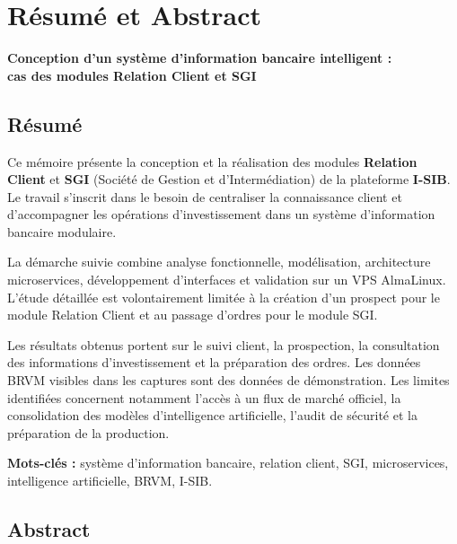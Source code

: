 \clearpage
\chapter*{Résumé et Abstract}
{}

\begin{center}
\textbf{Conception d'un système d'information bancaire intelligent :}\\
\textbf{cas des modules Relation Client et SGI}
\end{center}

\begingroup
\small
{}

\section*{Résumé}

\hspace{0.5cm}
Ce mémoire présente la conception et la réalisation des modules \textbf{Relation Client}
et \textbf{SGI} (Société de Gestion et d'Intermédiation) de la plateforme \textbf{I-SIB}.
Le travail s'inscrit dans le besoin de centraliser la connaissance client et
d'accompagner les opérations d'investissement dans un système d'information
bancaire modulaire.

\hspace{0.5cm}
La démarche suivie combine analyse fonctionnelle, modélisation, architecture
microservices, développement d'interfaces et validation sur un VPS AlmaLinux.
L'étude détaillée est volontairement limitée à la création d'un prospect pour
le module Relation Client et au passage d'ordres pour le module SGI.

\hspace{0.5cm}
Les résultats obtenus portent sur le suivi client, la prospection, la consultation
des informations d'investissement et la préparation des ordres. Les données BRVM
visibles dans les captures sont des données de démonstration. Les limites
identifiées concernent notamment l'accès à un flux de marché officiel, la
consolidation des modèles d'intelligence artificielle, l'audit de sécurité et
la préparation de la production.

\vspace{0.25cm}
\noindent
\textbf{Mots-clés :} système d'information bancaire, relation client, SGI,
microservices, intelligence artificielle, BRVM, I-SIB.

\section*{Abstract}

